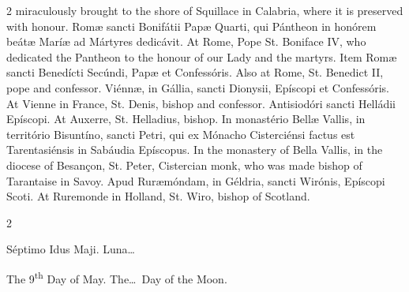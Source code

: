 \begin{paracol}{2}
 miraculously brought to the shore of Squillace in Calabria, where it is 
 preserved with honour.
\switchcolumn*
{}
Romæ sancti Bonifátii 
 Papæ Quarti, qui Pántheon in honórem beátæ Maríæ ad Mártyres dedicávit.
\switchcolumn
{}
At Rome, Pope St. Boniface IV, who 
 dedicated the Pantheon to the honour of our Lady and the martyrs.
\switchcolumn*
{}
Item Romæ sancti 
 Benedícti Secúndi, Papæ et Confessóris.
\switchcolumn
{}
Also at Rome, St. Benedict II, pope 
 and confessor.
\switchcolumn*
{}
Viénnæ, in Gállia, 
 sancti Dionysii, Epíscopi et Confessóris.
\switchcolumn
{}
At Vienne in France, St. Denis, 
 bishop and confessor.
\switchcolumn*
{}
Antisiodóri sancti 
 Helládii Epíscopi.
\switchcolumn
{}
At Auxerre, St. Helladius, bishop.
\switchcolumn*
{}
In monastério Bellæ 
 Vallis, in território Bisuntíno, sancti Petri, qui ex Mónacho Cisterciénsi 
 factus est Tarentasiénsis in Sabáudia Epíscopus.
\switchcolumn
{}
In the monastery of Bella Vallis, 
 in the diocese of Besançon, St. Peter, Cistercian monk, who was made bishop 
 of Tarantaise in Savoy.
\switchcolumn*
{}
Apud Ruræmóndam, in 
 Géldria, sancti Wirónis, Epíscopi Scoti.
\switchcolumn
{}
At Ruremonde in Holland, St. Wiro, 
 bishop of Scotland.
\switchcolumn*
{}
\end{paracol}


\begin{paracol}{2}
\begin{center}{\color{gregoriocolor} Séptimo Idus Maji. 
 Luna\dots\ }\end{center}
\switchcolumn
{}
\begin{center}{\color{gregoriocolor} The 
 9\textsuperscript{th} Day of May. The\dots\ Day of the Moon.}\end{center}
\end{paracol}

